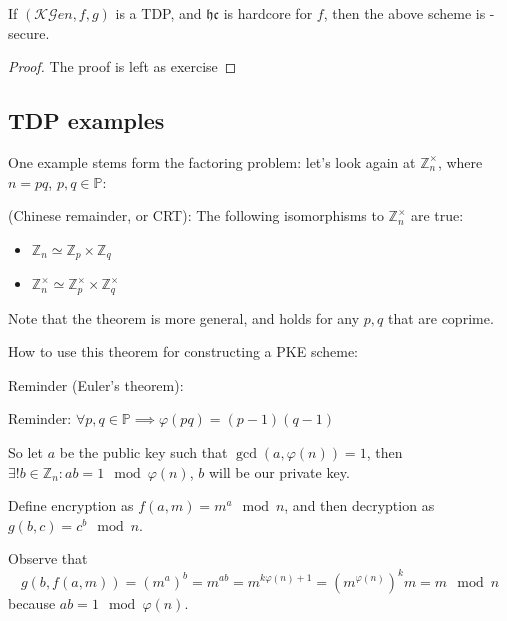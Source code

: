 \begin{theorem}
    If $(\mathcal{KG}en, f, g)$ is a TDP, and $\mathfrak{hc}$ is hardcore for $f$, then the above scheme is \cpa-secure.    
\end{theorem}

\begin{proof} The proof is left as exercise

\end{proof}

\subsection{TDP examples}

One example stems form the factoring problem: let's look again at $\mathbb{Z}_n^\times$, where $n = pq$, $p, q \in \mathbb{P}$:

\begin{theorem}
    (Chinese remainder, or CRT): The following isomorphisms to $\mathbb{Z}_n^\times$ are true:

\begin{itemize}
    \item $\mathbb{Z}_n \simeq \mathbb{Z}_p \times \mathbb{Z}_q$
    \item $\mathbb{Z}_n^\times \simeq \mathbb{Z}_p^\times \times \mathbb{Z}_q^\times$
\end{itemize}

Note that the theorem is more general, and holds for any $p, q$ that are coprime.
\end{theorem}

How to use this theorem for constructing a PKE scheme:

Reminder (Euler's theorem):

Reminder: $\forall p, q \in \mathbb{P} \implies \varphi(pq) = (p-1)(q-1)$

So let $a$ be the public key such that $\gcd(a, \varphi(n))=1$, then $\exists! b
\in \mathbb{Z}_n : ab = 1 \mod \varphi(n)$, $b$ will be our private key.

Define encryption as $f(a, m) = m^a \mod n$, and then decryption as $g(b, c) =
c^b \mod n$.

Observe that 
\[
    g(b, f(a, m)) = (m^a)^b =m^{ab}=m^{k\varphi(n)+1}=(m^{\varphi(n)})^{k}m = m \mod n
\]
because $ab = 1 \mod \varphi(n)$.

